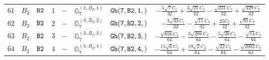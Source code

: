 \documentclass[fleqn,8pt]{jsarticle}
\begin{document}
\begin{table}[ht!]
\begin{center}
\begin{tabular}{cccccccc}
$ 61 $ & $ B_{2} $ & $ {\tt B2} $ & $ 1 $ & $ - $ & $ \mathbb{G}_{7}^{(h,B_{2},1)} $ & $ {\tt Gh(7,B2,1,)} $ & $ - \frac{5 \sqrt{7} C_{1}}{32} + \frac{3 \sqrt{21} C_{3}}{32} - \frac{\sqrt{231} C_{5}}{32} + \frac{\sqrt{429} C_{7}}{32} $ \\
$ 62 $ & $ B_{2} $ & $ {\tt B2} $ & $ 2 $ & $ - $ & $ \mathbb{G}_{7}^{(h,B_{2},2)} $ & $ {\tt Gh(7,B2,2,)} $ & $ - \frac{3 \sqrt{33} C_{1}}{32} - \frac{\sqrt{11} C_{3}}{32} + \frac{25 C_{5}}{32} + \frac{\sqrt{91} C_{7}}{32} $ \\
$ 63 $ & $ B_{2} $ & $ {\tt B2} $ & $ 3 $ & $ - $ & $ \mathbb{G}_{7}^{(h,B_{2},3)} $ & $ {\tt Gh(7,B2,3,)} $ & $ - \frac{\sqrt{858} C_{1}}{64} - \frac{3 \sqrt{286} C_{3}}{64} - \frac{5 \sqrt{26} C_{5}}{64} - \frac{\sqrt{14} C_{7}}{64} $ \\
$ 64 $ & $ B_{2} $ & $ {\tt B2} $ & $ 4 $ & $ - $ & $ \mathbb{G}_{7}^{(h,B_{2},4)} $ & $ {\tt Gh(7,B2,4,)} $ & $ - \frac{15 \sqrt{6} C_{1}}{64} + \frac{19 \sqrt{2} C_{3}}{64} - \frac{\sqrt{22} C_{5}}{64} - \frac{\sqrt{2002} C_{7}}{64} $ \\
 \hline \hline
\end{tabular}
\end{center}
\end{table}
\end{document}
